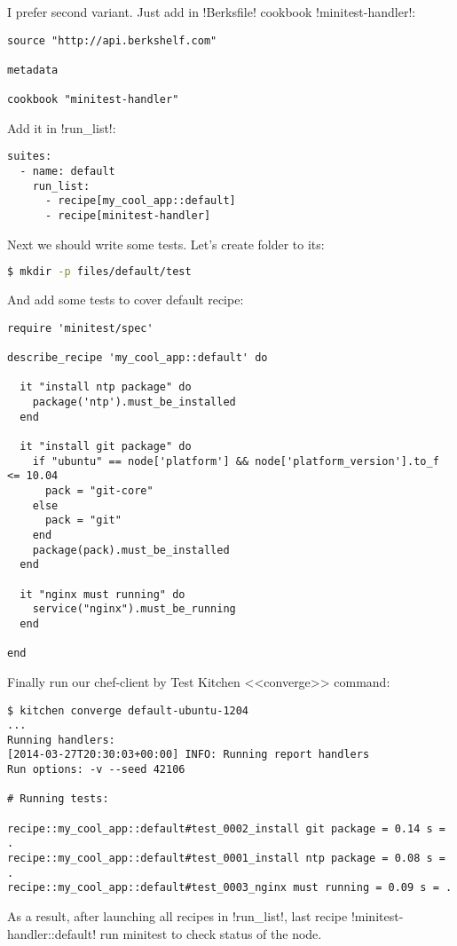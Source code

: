 I prefer second variant. Just add in \inline!Berksfile! cookbook \inline!minitest-handler!:

\begin{lstlisting}[label=lst:testing-minitest5]
source "http://api.berkshelf.com"

metadata

cookbook "minitest-handler"
\end{lstlisting}

Add it in \inline!run_list!:

\begin{lstlisting}[label=lst:testing-minitest6]
suites:
  - name: default
    run_list:
      - recipe[my_cool_app::default]
      - recipe[minitest-handler]
\end{lstlisting}

Next we should write some tests. Let's create folder to its:

\begin{lstlisting}[language=Bash,label=lst:testing-minitest7]
$ mkdir -p files/default/test
\end{lstlisting}

And add some tests to cover default recipe:

\begin{lstlisting}[label=lst:testing-minitest8,title=my-server-cloud/site-cookbooks/my\_cool\_app/files/default/test/default\_test.rb]
require 'minitest/spec'

describe_recipe 'my_cool_app::default' do

  it "install ntp package" do
    package('ntp').must_be_installed
  end

  it "install git package" do
    if "ubuntu" == node['platform'] && node['platform_version'].to_f <= 10.04
      pack = "git-core"
    else
      pack = "git"
    end
    package(pack).must_be_installed
  end

  it "nginx must running" do
    service("nginx").must_be_running
  end

end
\end{lstlisting}

Finally run our chef-client by Test Kitchen <<converge>> command:

\begin{lstlisting}[label=lst:testing-minitest9]
$ kitchen converge default-ubuntu-1204
...
Running handlers:
[2014-03-27T20:30:03+00:00] INFO: Running report handlers
Run options: -v --seed 42106

# Running tests:

recipe::my_cool_app::default#test_0002_install git package = 0.14 s = .
recipe::my_cool_app::default#test_0001_install ntp package = 0.08 s = .
recipe::my_cool_app::default#test_0003_nginx must running = 0.09 s = .
\end{lstlisting}

As a result, after launching all recipes in \inline!run_list!, last recipe \inline!minitest-handler::default! run minitest to check status of the node.